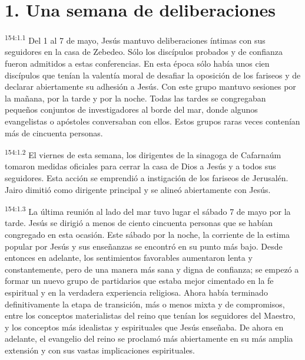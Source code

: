 \section*{1. Una semana de deliberaciones}
\par
\textsuperscript{154:1.1} Del 1 al 7 de mayo, Jesús mantuvo deliberaciones íntimas con sus seguidores en la casa de Zebedeo. Sólo los discípulos probados y de confianza fueron admitidos a estas conferencias. En esta época sólo había unos cien discípulos que tenían la valentía moral de desafiar la oposición de los fariseos y de declarar abiertamente su adhesión a Jesús. Con este grupo mantuvo sesiones por la mañana, por la tarde y por la noche. Todas las tardes se congregaban pequeños conjuntos de investigadores al borde del mar, donde algunos evangelistas o apóstoles conversaban con ellos. Estos grupos raras veces contenían más de cincuenta personas.

\par
\textsuperscript{154:1.2} El viernes de esta semana, los dirigentes de la sinagoga de Cafarnaúm tomaron medidas oficiales para cerrar la casa de Dios a Jesús y a todos sus seguidores. Esta acción se emprendió a instigación de los fariseos de Jerusalén. Jairo dimitió como dirigente principal y se alineó abiertamente con Jesús.

\par
\textsuperscript{154:1.3} La última reunión al lado del mar tuvo lugar el sábado 7 de mayo por la tarde. Jesús se dirigió a menos de ciento cincuenta personas que se habían congregado en esta ocasión. Este sábado por la noche, la corriente de la estima popular por Jesús y sus enseñanzas se encontró en su punto más bajo. Desde entonces en adelante, los sentimientos favorables aumentaron lenta y constantemente, pero de una manera más sana y digna de confianza; se empezó a formar un nuevo grupo de partidarios que estaba mejor cimentado en la fe espiritual y en la verdadera experiencia religiosa. Ahora había terminado definitivamente la etapa de transición, más o menos mixta y de compromisos, entre los conceptos materialistas del reino que tenían los seguidores del Maestro, y los conceptos más idealistas y espirituales que Jesús enseñaba. De ahora en adelante, el evangelio del reino se proclamó más abiertamente en su más amplia extensión y con sus vastas implicaciones espirituales.

